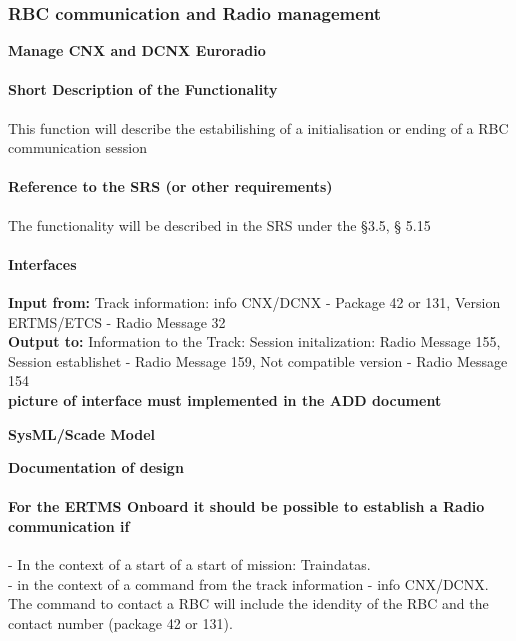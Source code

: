 \documentclass{template/openetcs_report}
\begin{document}
\subsubsection{RBC communication and Radio management}
\textbf{Manage CNX and DCNX Euroradio}

\paragraph{Short Description of the Functionality}
This function will describe the estabilishing of a initialisation or ending of a RBC communication session\\

\paragraph{Reference to the SRS (or other requirements)}
The functionality will be described in the SRS under the §3.5, § 5.15\\

\paragraph{Interfaces}
\textbf{Input from:} Track information: info CNX/DCNX - Package 42 or 131, Version ERTMS/ETCS - Radio Message 32\\

\textbf{Output to:} Information to the Track: Session initalization: Radio Message 155, Session establishet - Radio Message 159, Not compatible version - Radio Message 154\\

\textbf{picture of interface must implemented in the ADD document}

\textbf{SysML/Scade Model}

\textbf{Documentation of design}

 \paragraph{For the ERTMS Onboard it should be possible to establish a Radio communication if}

- In the context of a start of a start of mission: Traindatas.\\

- in the context of a command from the track information - info CNX/DCNX. The command to contact a RBC will include the idendity of the RBC and the contact number (package 42 or 131).\\
\end{document}
